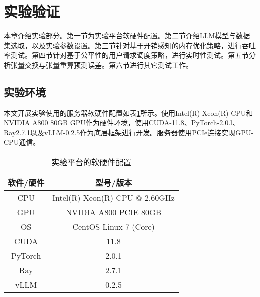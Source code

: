\section{实验验证}

本章介绍实验部分。第一节为实验平台软硬件配置。第二节介绍LLM模型与数据集选取，以及实验参数设置。第三节针对基于开销感知的内存优化策略，进行吞吐率测试。第四节针对基于公平性的用户请求调度策略，进行实时性测试。第五节分析张量交换与张量重算预测误差。第六节进行其它测试工作。

\subsection{实验环境}

本文开展实验使用的服务器软硬件配置如表\ref{Table:实验平台的软硬件配置}所示。使用Intel(R) Xeon(R) CPU和NVIDIA A800 80GB GPU作为硬件环境，使用CUDA-11.8、PyTorch-2.0.l、Ray2.7.1以及vLLM-0.2.5作为底层框架进行开发。服务器使用PCIe连接实现GPU-CPU通信。

\begin{table}[H]
  \centering
  \caption{实验平台的软硬件配置}
  \label{Table:实验平台的软硬件配置}
  \renewcommand{\arraystretch}{1.25}
  \small
  \begin{tabular}{c c}
    \toprule
    \textbf{软件/硬件} & \textbf{型号/版本} \\ 
    \midrule
    CPU & Intel(R) Xeon(R) CPU @ 2.60GHz  \\ 
    GPU & NVIDIA A800 PCIE 80GB \\ 
    OS & CentOS Linux 7 (Core) \\ 
    CUDA & 11.8 \\ 
    PyTorch & 2.0.1 \\ 
    Ray & 2.7.1 \\
    vLLM & 0.2.5 \\ 
    \bottomrule
  \end{tabular}
\end{table}


